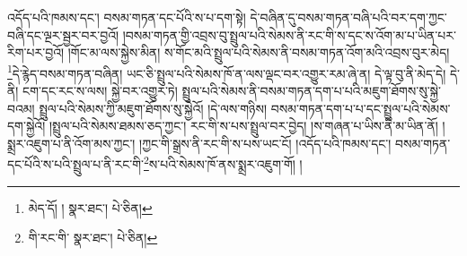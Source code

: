 འདོད་པའི་ཁམས་དང་། བསམ་གཏན་དང་པོའི་ས་པ་དག་སྟེ། དེ་བཞིན་དུ་བསམ་གཏན་བཞི་པའི་བར་དག་ཀྱང་བཞི་དང་ལྔར་སྦྱར་བར་བྱའོ། །བསམ་གཏན་གྱི་འབྲས་བུ་སྤྲུལ་པའི་སེམས་ནི་རང་གི་ས་དང་ས་འོག་མ་པ་ཡིན་པར་རིག་པར་བྱའོ། །གོང་མ་ལས་སྐྱེས་མིན། ས་གོང་མའི་སྤྲུལ་པའི་སེམས་ནི་བསམ་གཏན་འོག་མའི་འབྲས་བུར་མེད། \footnote{མེད་དོ། །   སྣར་ཐང་།  པེ་ཅིན། }དེ་རྙེད་བསམ་གཏན་བཞིན། ཡང་ཅི་སྤྲུལ་པའི་སེམས་ཁོ་ན་ལས་ལྡང་བར་འགྱུར་རམ་ཞེ་ན། དེ་ལྟ་བུ་ནི་མེད་དེ། དེ་ནི། ངག་དང་རང་ས་ལས། སྐྱེ་བར་འགྱུར་ཏེ། སྤྲུལ་པའི་སེམས་ནི་བསམ་གཏན་དག་པ་པའི་མཇུག་ཐོགས་སུ་སྐྱེ་བའམ། སྤྲུལ་པའི་སེམས་ཀྱི་མཇུག་ཐོགས་སུ་སྐྱེའོ། །དེ་ལས་གཉིས། བསམ་གཏན་དག་པ་པ་དང་སྤྲུལ་པའི་སེམས་དག་སྐྱེའོ། །སྤྲུལ་པའི་སེམས་ཐམས་ཅད་ཀྱང་། རང་གི་ས་པས་སྤྲུལ་བར་བྱེད། །ས་གཞན་པ་ཡིས་ནི་མ་ཡིན་ནོ། །སྨྲར་འཇུག་པ་ནི་འོག་མས་ཀྱང་། །ཀྱང་གི་སྒྲས་ནི་རང་གི་ས་པས་ཡང་ངོ། །འདོད་པའི་ཁམས་དང་། བསམ་གཏན་དང་པོའི་ས་པའི་སྤྲུལ་པ་ནི་རང་གི་\footnote{གི་རང་གི་  སྣར་ཐང་།  པེ་ཅིན། }ས་པའི་སེམས་ཁོ་ནས་སྨྲར་འཇུག་གོ། །
